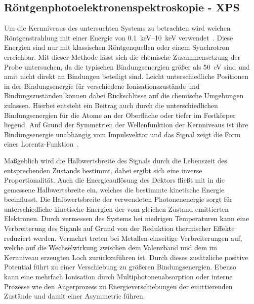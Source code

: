         \subsection{Röntgenphotoelektronenspektroskopie - XPS} \label{sec:XPS}
            Um die Kernniveaus des untersuchten Systems zu betrachten wird weichen Röntgenstrahlung mit einer Energie von \SIrange{0.1}{10}{\kilo\electronvolt} verwendet~\cite{Fauster}.
            Diese Energien sind nur mit klassischen Röntgenquellen oder einem Synchrotron erreichbar.
            Mit dieser Methode lässt sich die chemische Zusammensetzung der Probe untersuchen, da die typischen Bindungsenergien größer als \SI{50}{\electronvolt} sind und amit nicht direkt an Bindungen beteiligt sind.
            Leicht unterschiedliche Positionen in der Bindungsenergie für verschiedene Ionisationszustände und Bindungszuständen können dabei Rückschlüsse auf die chemische Umgebungen zulassen.
            Hierbei entsteht ein Beitrag auch durch die unterschiedlichen Bindungsenergien für die Atome an der Oberfläche oder tiefer im Festkörper liegend.
            Auf Grund der Symmetrien der Wellenfunktion der Kernniveaus ist ihre Bindungsenergie unabhängig vom Impulsvektor und das Signal zeigt die Form einer Lorentz-Funktion~\cite{Hüfner}.

            Maßgeblich wird die Halbwertsbreite des Signals durch die Lebenszeit des entsprechenden Zustands bestimmt, dabei ergibt sich eine inverse Proportionalität.
            Auch die Energieauflösung des Dektors fließt mit in die gemessene Halbwertsbreite ein, welches die bestimmte kinetische Energie beeinflusst.
            Die Halbwertsbreite der verwendeten Photonenenergie sorgt für unterschiedliche kinetische Energien der vom gleichen Zustand emittierten Elektronen.
            Durch vermessen des Systems bei niedrigen Temperaturen kann eine Verbreiterung des Siganls auf Grund von der Reduktion thermischer Effekte reduziert werden.
            Vermehrt treten bei Metallen einseitige Verbreiterungen auf, welche auf die Wechselwirkung zwischen dem Valenzband und dem im Kernniveau erzeugten Loch zurückzuführen ist.
            Durch dieses zusätzliche positive Potential führt zu einer Verschiebung zu größeren Bindungsenergien.
            Ebenso kann eine mehrfach Ionisation durch Multiphotonenabsorption oder interne Prozesse wie den Augerprozess zu Energieverschiebungen der emittierenden Zustände und damit einer Asymmetrie führen.

